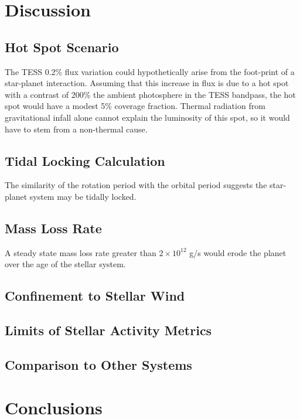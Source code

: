 \documentclass[twocolumn]{aastex631}
\begin{document}
\section{Discussion}
\subsection{Hot Spot Scenario}
The TESS 0.2\% flux variation could hypothetically arise from the foot-print of a star-planet interaction. Assuming that this increase in flux is due to a hot spot with a contrast of 200\% the ambient photosphere in the TESS bandpass, the hot spot would have a modest 5\% coverage fraction.  Thermal radiation from gravitational infall alone cannot explain the luminosity of this spot, so it would have to stem from a non-thermal cause.

\subsection{Tidal Locking Calculation}
The similarity of the rotation period with the orbital period suggests the star-planet system may be tidally locked.

\subsection{Mass Loss Rate}
A steady state mass loss rate greater than $2\times10^{12}$ g/s would erode the planet over the age of the stellar system.

\subsection{Confinement to Stellar Wind}
\subsection{Limits of Stellar Activity Metrics}
\subsection{Comparison to Other Systems}
\section{Conclusions}


\clearpage
\pagebreak


\appendix
\end{document}
